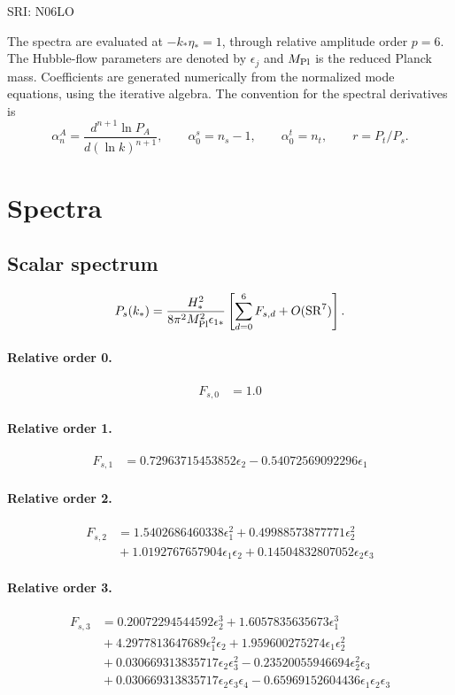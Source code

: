 \documentclass[10pt]{article}
\begin{document}
\begin{center}\Large SRI: N06LO\end{center}
The spectra are evaluated at $-k_*\eta_*=1$, through relative amplitude
order $p=6$. The Hubble-flow parameters are denoted by $\epsilon_j$
and $M_{\rm Pl}$ is the reduced Planck mass. Coefficients are generated
numerically from the normalized mode equations, using the iterative algebra.
The convention for the spectral derivatives is
\[
\alpha_n^A=\frac{d^{n+1}\ln P_A}{d(\ln k)^{n+1}},\qquad
\alpha_0^s=n_s-1,\qquad\alpha_0^t=n_t,\qquad r=P_t/P_s.
\]
\section{Spectra}

\subsection{Scalar spectrum}
\[P_s(k_*)=\frac{H_*^2}{8\pi^2M_{\rm Pl}^2\epsilon_{1*}}\left[\sum_{d=0}^{6}F_{s,d}+O(\mathrm{SR}^{7})\right].\]
\paragraph{Relative order 0.}
\begin{align*}
F_{s,0} &= 1.0
\end{align*}

\paragraph{Relative order 1.}
\begin{align*}
F_{s,1} &= 0.72963715453852 \epsilon_{2} - 0.54072569092296 \epsilon_{1}
\end{align*}

\paragraph{Relative order 2.}
\begin{align*}
F_{s,2} &= 1.5402686460338 \epsilon_{1}^{2} + 0.49988573877771 \epsilon_{2}^{2} \\
&{}  + 1.0192767657904 \epsilon_{1} \epsilon_{2} + 0.14504832807052 \epsilon_{2} \epsilon_{3}
\end{align*}

\paragraph{Relative order 3.}
\begin{align*}
F_{s,3} &= 0.20072294544592 \epsilon_{2}^{3} + 1.6057835635673 \epsilon_{1}^{3} \\
&{}  + 4.2977813647689 \epsilon_{1}^{2} \epsilon_{2} + 1.959600275274 \epsilon_{1} \epsilon_{2}^{2} \\
&{}  + 0.030669313835717 \epsilon_{2} \epsilon_{3}^{2} - 0.23520055946694 \epsilon_{2}^{2} \epsilon_{3} \\
&{}  + 0.030669313835717 \epsilon_{2} \epsilon_{3} \epsilon_{4} - 0.65969152604436 \epsilon_{1} \epsilon_{2} \epsilon_{3}
\end{align*}
\end{document}
